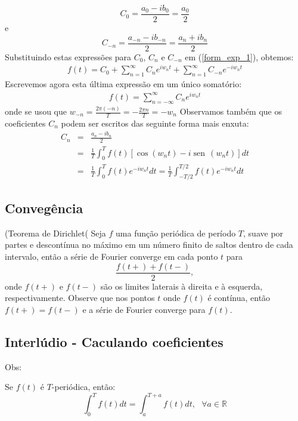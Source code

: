 \documentclass[a4paper,10pt]{book}
\newcommand{\sen}{\operatorname{sen}\,}
\begin{document}
\begin{equation}
C_0 = \frac{a_0 - ib_0}{2}=\frac{a_0}{2}
\end{equation}
e
\begin{equation}
C_{-n} = \frac{a_{-n} - ib_{-n}}{2}=\frac{a_{n} + ib_{n}}{2}
\end{equation}
Substituindo estas expressões para $C_0$, $C_{n}$ e $C_{-n}$ em (\ref{form_exp_1}), obtemos:
\begin{eqnarray*}
f(t)=C_0+\sum_{n=1}^\infty C_n e^{iw_nt}+\sum_{n=1}^\infty C_{-n}e^{-iw_nt}
\end{eqnarray*}
Escrevemos agora esta última expressão em um único somatório:
 \begin{eqnarray}\label{forma_exp}
 f(t)=\sum_{n=-\infty}^\infty C_n e^{iw_nt}
 \end{eqnarray}
 onde se usou que $w_{-n}=\frac{2\pi (-n)}{T}=-\frac{2\pi n}{T}=-w_n$
 Observamos também que os coeficientes $C_n$ podem ser escritos das seguinte forma mais enxuta:
 \begin{eqnarray*}
 C_n &=& \frac{a_n - ib_n}{2}\\
 &=& \frac{1}{T}\int_0^Tf(t)\left[\cos(w_n t)-i\sen(w_n t)\right]dt\\
 &=&\frac{1}{T}\int_0^Tf(t)e^{-iw_nt}dt =\frac{1}{T}\int_{-T/2}^{T/2}f(t)e^{-iw_nt}dt 
 \end{eqnarray*}


\subsection{Convegência}
(Teorema de Dirichlet( Seja $f$ uma função periódica de período $T$, suave por partes e descontínua no máximo em um número finito de saltos dentro de cada intervalo, então a série de Fourier converge em cada ponto $t$ para
\begin{equation}
\frac{f(t+)+f(t-)}{2},
\end{equation}
onde $f(t+)$ e $f(t-)$ são os limites laterais à direita e à esquerda, respectivamente. Observe que nos pontos $t$ onde $f(t)$ é contínua, então $f(t+)=f(t-)$ e a série de Fourier converge para $f(t)$.

 
\subsection{Interlúdio - Caculando coeficientes}

{Obs:}

Se $f(t)$ é $T$-periódica, então:
$$\int_0^T f(t)dt = \int_{a}^{T+a}f(t)dt,~~~\forall a \in \mathbb{R}$$
\end{document}
